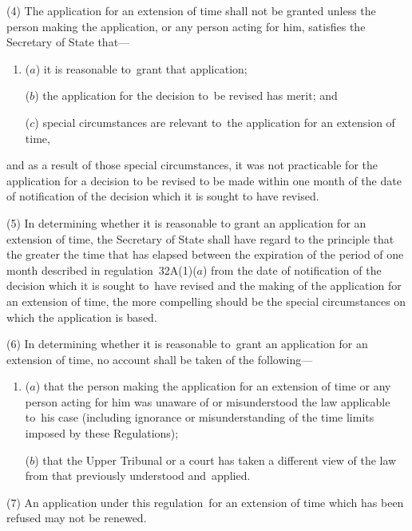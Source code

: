 \documentclass[12pt,a4paper]{article}
\begin{document}
(4) The application for an extension of time shall not be granted unless the person making the application, or any person acting for him, satisfies the Secretary of State that---
\begin{enumerate}\item[]
($a$) it is reasonable to~grant that application;

($b$) the application for the decision to~be revised has merit; and

($c$) special circumstances are relevant to~the application for an extension of time,
\end{enumerate}
and as a result of those special circumstances, it was not practicable for the application for a decision to be revised to be made within one month of the date of notification of the decision which it is sought to have revised.

(5) In determining whether it is reasonable to grant an application for an extension of time, the Secretary of State shall have regard to the principle that the greater the time that has elapsed between the expiration of the period of one month described in regulation~32A(1)($a$) from the date of notification of the decision which it is sought to~have revised and the making of the application for an extension of time, the more compelling should be the special circumstances on which the application is based.

(6) In determining whether it is reasonable to~grant an application for an extension of time, no account shall be taken of the following---
\begin{enumerate}\item[]
($a$) that the person making the application for an extension of time or any person acting for him was unaware of or misunderstood the law applicable to~his case (including ignorance or misunderstanding of the time limits imposed by these Regulations);

($b$) that 
the Upper Tribunal  %
or a court has taken a different view of the law from that previously understood and~applied.
\end{enumerate}

(7) An application under this regulation~for an extension of time which has been refused may not be renewed.

\end{document}
